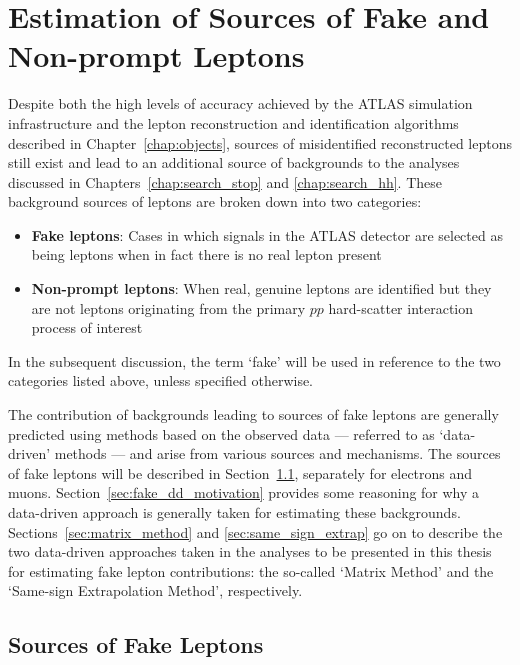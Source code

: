 \section{Estimation of Sources of Fake and Non-prompt Leptons}
\label{sec:fakes}

Despite both the high levels of accuracy achieved by the ATLAS simulation
infrastructure and the lepton reconstruction and identification algorithms
described in Chapter~\ref{chap:objects}, sources of misidentified reconstructed
leptons still exist and lead to an additional source of backgrounds to
the analyses discussed in Chapters~\ref{chap:search_stop} and \ref{chap:search_hh}.
These background sources of leptons are broken down into two categories:
\begin{itemize}
    \item \textbf{Fake leptons}: Cases in which signals in the ATLAS detector
        are selected as being leptons when in fact there is no real lepton present
    \item \textbf{Non-prompt leptons}: When real, genuine leptons are identified
        but they are not leptons originating from the primary $pp$ hard-scatter interaction process
        of interest
\end{itemize}
In the subsequent discussion, the term `fake' will be used in reference to the two
categories listed above, unless specified otherwise.

The contribution of backgrounds leading to sources of fake leptons are generally predicted
using methods based on the observed data --- referred to as `data-driven' methods ---
and arise from various sources and mechanisms.
The sources of fake leptons will be described in Section~\ref{sec:fake_lepton_sources}, separately for
electrons and muons.
Section~\ref{sec:fake_dd_motivation} provides some reasoning for why a data-driven
approach is generally taken for estimating these backgrounds.
Sections~\ref{sec:matrix_method} and \ref{sec:same_sign_extrap} go on to describe
the two data-driven approaches taken in the analyses to be presented in this thesis
for estimating fake lepton contributions: the so-called `Matrix Method' and the `Same-sign Extrapolation Method', respectively.

%
%
\subsection{Sources of Fake Leptons}
\label{sec:fake_lepton_sources}

